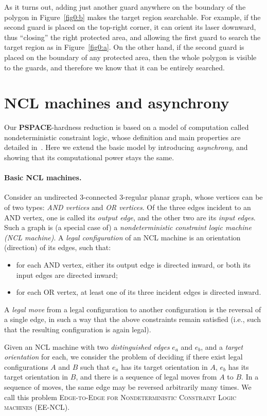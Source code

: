 \documentclass{style}
\newcommand{\complexityclass}[1]{\textbf{#1}}
\newcommand{\computproblem}[1]{\textsc{#1}}
\newcommand{\PSPACE}{\complexityclass{PSPACE}\xspace}
\newcommand{\EENCL}{\computproblem{EE-NCL}\xspace}
\begin{document}
As it turns out, adding just another guard anywhere on the boundary of the polygon in Figure~\ref{fig0:b} makes the target region searchable. For example, if the second guard is placed on the top-right corner, it can orient its laser downward, thus ``closing'' the right protected area, and allowing the first guard to search the target region as in Figure~\ref{fig0:a}. On the other hand, if the second guard is placed on the boundary of any protected area, then the whole polygon is visible to the guards, and therefore we know that it can be entirely searched.

\section{NCL machines and asynchrony} \label{sectionncl}

Our \PSPACE-hardness reduction is based on a model of computation called nondeterministic constraint logic, whose definition and main properties are detailed in~\cite{ncl}. Here we extend the basic model by introducing \emph{asynchrony}, and showing that its computational power stays the same.

\paragraph{Basic NCL machines.}

Consider an undirected 3-connected 3-regular planar graph, whose vertices can be of two types: \emph{AND vertices} and \emph{OR vertices}. Of the three edges incident to an AND vertex, one is called its \emph{output edge}, and the other two are its \emph{input edges}. Such a graph is (a special case of) a \emph{nondeterministic constraint logic machine (NCL machine)}. A \emph{legal configuration} of an NCL machine is an orientation (direction) of its edges, such that:
\begin{itemize}
\item for each AND vertex, either its output edge is directed inward, or both its input edges are directed inward;
\item for each OR vertex, at least one of its three incident edges is directed inward.
\end{itemize}
A \emph{legal move} from a legal configuration to another configuration is the reversal of a single edge, in such a way that the above constraints remain satisfied (i.e., such that the resulting configuration is again legal).

Given an NCL machine with two \emph{distinguished edges} $e_a$ and $e_b$, and a \emph{target orientation} for each, we consider the problem of deciding if there exist legal configurations $A$ and $B$ such that $e_a$ has its target orientation in $A$, $e_b$ has its target orientation in $B$, and there is a sequence of legal moves from $A$ to $B$. In a sequence of moves, the same edge may be reversed arbitrarily many times. We call this problem \computproblem{Edge-to-Edge for Nondeterministic Constraint Logic machines} (\EENCL).
\end{document}
